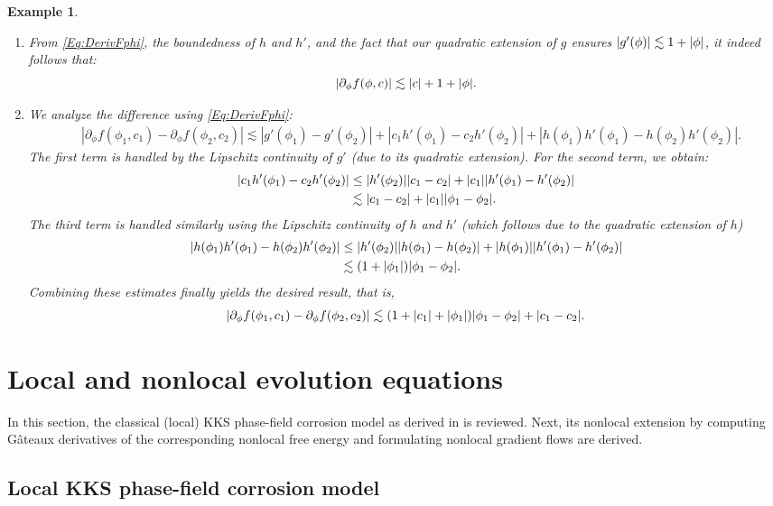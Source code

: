 \documentclass[]{article}
\newtheorem{example}{Example}
\DeclarePairedDelimiter{\abs}{\lvert}{\rvert}
\begin{document}
\begin{example}
\begin{enumerate}[label=\textup{(F\arabic*)}, ref=F\arabic*]
	\item  From \eqref{Eq:DerivFphi}, the boundedness of $h$ and $h'$, and the fact that our quadratic extension of $g$ ensures $|g'(\phi)| \lesssim 1 + \abs{\phi}$, it indeed follows that:
	$$|\partial_\phi f(\phi,c)| \lesssim \vert c\vert + 1 + \abs{\phi}.$$
	
	\item  We analyze the difference using \eqref{Eq:DerivFphi}:
	\begin{align*}
		&|\partial_{\phi}f(\phi_1,c_1)-\partial_\phi f(\phi_2,c_2)| \lesssim |g'(\phi_1)-g'(\phi_2)| + |c_1 h'(\phi_1) - c_2 h'(\phi_2)| + |h(\phi_1)h'(\phi_1) - h(\phi_2)h'(\phi_2)|.
	\end{align*}
	The first term is handled by the Lipschitz continuity of $g'$ (due to its quadratic extension). For the second term, we obtain:
	\begin{align*}
		|c_1 h'(\phi_1) - c_2 h'(\phi_2)| &\leq |h'(\phi_2)| |c_1 - c_2| + \abs{c_1} |h'(\phi_1) - h'(\phi_2)| \\
		&\lesssim |c_1 - c_2| + \abs{c_1} |\phi_1 - \phi_2|.
	\end{align*}
	The third term is handled similarly using the Lipschitz continuity of $h$ and $h'$ (which follows due to the quadratic extension of $h$) 
	\begin{align*}
		|h(\phi_1) h'(\phi_1) - h(\phi_2) h'(\phi_2)| &\leq |h'(\phi_2)| |h(\phi_1) - h(\phi_2)| + |h(\phi_1)| |h'(\phi_1) - h'(\phi_2)| \\
		&\lesssim (1+ \abs{\phi_1}) |\phi_1 - \phi_2|.
	\end{align*}
	Combining these estimates finally yields the desired result, that is,
	$$
	|\partial_{\phi}f(\phi_1,c_1)-\partial_\phi f(\phi_2,c_2)| \lesssim (1 + \abs{c_1}+\abs{\phi_1}) |\phi_1 - \phi_2| + |c_1 - c_2|.
	$$
\end{enumerate}
\end{example}

\section{Local and nonlocal evolution equations}\label{sec:evolution}

In this section, the classical (local) KKS phase-field corrosion model as derived in \cite{kim1999phase} is reviewed. Next, its nonlocal extension by computing G\^{a}teaux derivatives of the corresponding nonlocal free energy and formulating nonlocal gradient flows are derived.

\subsection{Local KKS phase-field corrosion model}\label{subsec:local}
\end{document}
